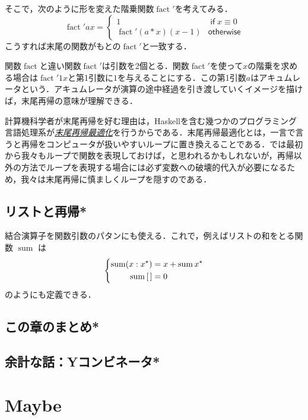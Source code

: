 \documentclass[a4paper]{jsbook}
\newcommand{\programminglanguage}[1]{\textsf{#1}}
\newcommand{\haskell}{\programminglanguage{Haskell}}
\newcommand{\keyword}[1]{{\underline{\emph{#1}}}}
\newcommand{\mList}[1]{{#1}^\mathrm{\star}}
\DeclareMathOperator{\mSum}{sum}
\DeclareMathOperator{\mathFactorial}{fact}
\newcommand{\mathKeyword}[1]{\operatorname{\textsf{#1}}}
\newcommand{\mathIf}{\mathKeyword{if}}
\newcommand{\mathOtherwise}{\mathKeyword{otherwise}}
\begin{document}
そこで，次のように形を変えた階乗関数$\mathFactorial'$を考えてみる．
\begin{equation}
\mathFactorial'ax=\begin{cases}
1&\mathIf x\equiv0\\
\mathFactorial'(a*x)(x-1)&\mathOtherwise
\end{cases}
\end{equation}
こうすれば末尾の関数がもとの$\mathFactorial'$と一致する．

関数$\mathFactorial$と違い関数$\mathFactorial'$は引数を2個とる．関数$\mathFactorial'$を使って$x$の階乗を求める場合は$\mathFactorial'1x$と第1引数に$1$を与えることにする．この第1引数$a$はアキュムレータという．アキュムレータが演算の途中経過を引き渡していくイメージを描けば，末尾再帰の意味が理解できる．

計算機科学者が末尾再帰を好む理由は，\haskell を含む幾つかのプログラミング言語処理系が\keyword{末尾再帰最適化}を行うからである．末尾再帰最適化とは，一言で言うと再帰をコンピュータが扱いやすいループに置き換えることである．では最初から我々もループで関数を表現しておけば，と思われるかもしれないが，再帰以外の方法でループを表現する場合には必ず変数への破壊的代入が必要になるため，我々は末尾再帰に慎ましくループを隠すのである．

\section{リストと再帰*}

結合演算子を関数引数のパタンにも使える．これで，例えばリストの和をとる関数 $\mSum$ は
\begin{equation}
\left\{
\begin{split}
\mSum(x:\mList{x})&=x+\mSum\mList{x}\\
\mSum\mEmptyList&=0
\end{split}
\right.
\end{equation}
のようにも定義できる．

\section*{この章のまとめ*}

\section{余計な話：Yコンビネータ*}


\chapter{Maybe}
\end{document}

